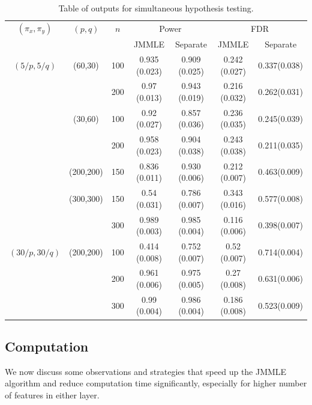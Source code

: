 \begin{scriptsize}
\begin{table}
    \begin{tabular}{ccccccc}
    \hline
%
$(\pi_x, \pi_y)$ & $(p,q)$   & $n$ & \multicolumn{2}{c}{Power} & \multicolumn{2}{c}{FDR}\\\cline{4-7}
 & & & JMMLE     & Separate			   & JMMLE         & Separate           \\ \hline
    $(5/p, 5/q)$ & (60,30)   & 100 & 0.935 (0.023) & 0.909 (0.025) & 0.242 (0.027) & 0.337(0.038) \\
    ~            & ~         & 200 & 0.97  (0.013) & 0.943 (0.019) & 0.216 (0.032) & 0.262(0.031) \\
    ~            & (30,60)   & 100 & 0.92  (0.027) & 0.857 (0.036) & 0.236 (0.035) & 0.245(0.039) \\
    ~            & ~         & 200 & 0.958 (0.023) & 0.904 (0.038) & 0.243 (0.038) & 0.211(0.035) \\
    ~            & (200,200) & 150 & 0.836 (0.011) & 0.930 (0.006) & 0.212 (0.007) & 0.463(0.009) \\
    ~            & (300,300) & 150 & 0.54  (0.031) & 0.786 (0.007) & 0.343 (0.016) & 0.577(0.008) \\
    ~            & ~         & 300 & 0.989 (0.003) & 0.985 (0.004) & 0.116 (0.006) & 0.398(0.007) \\ \hline
  $(30/p, 30/q)$ & (200,200) & 100 & 0.414 (0.008) & 0.752 (0.007) & 0.52  (0.007) & 0.714(0.004) \\
    ~            & ~         & 200 & 0.961 (0.006) & 0.975 (0.005) & 0.27  (0.008) & 0.631(0.006) \\
    ~            & ~         & 300 & 0.99  (0.004) & 0.986 (0.004) & 0.186 (0.008) & 0.523(0.009) \\ 
\hline    
\end{tabular}
    \caption{Table of outputs for simultaneous hypothesis testing.}
    \label{table:simtable32}
\end{table}
\end{scriptsize}

\subsection{Computation}
\label{sec:tricks-jmmle}
We now discuss some observations and strategies that speed up the JMMLE algorithm and reduce computation time significantly, especially for higher number of features in either layer.

